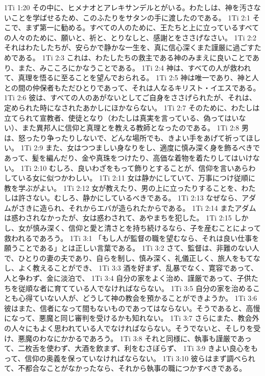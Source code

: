 1Ti 1:20  その中に、ヒメナオとアレキサンデルとがいる。わたしは、神を汚さないことを学ばせるため、このふたりをサタンの手に渡したのである。
1Ti 2:1  そこで、まず第一に勧める。すべての人のために、王たちと上に立っているすべての人々のために、願いと、祈と、とりなしと、感謝とをささげなさい。
1Ti 2:2  それはわたしたちが、安らかで静かな一生を、真に信心深くまた謹厳に過ごすためである。
1Ti 2:3  これは、わたしたちの救主である神のみまえに良いことであり、また、みこころにかなうことである。
1Ti 2:4  神は、すべての人が救われて、真理を悟るに至ることを望んでおられる。
1Ti 2:5  神は唯一であり、神と人との間の仲保者もただひとりであって、それは人なるキリスト・イエスである。
1Ti 2:6  彼は、すべての人のあがないとしてご自身をささげられたが、それは、定められた時になされたあかしにほかならない。
1Ti 2:7  そのために、わたしは立てられて宣教者、使徒となり（わたしは真実を言っている、偽ってはいない）、また異邦人に信仰と真理とを教える教師となったのである。
1Ti 2:8  男は、怒ったり争ったりしないで、どんな場所でも、きよい手をあげて祈ってほしい。
1Ti 2:9  また、女はつつましい身なりをし、適度に慎み深く身を飾るべきであって、髪を編んだり、金や真珠をつけたり、高価な着物を着たりしてはいけない。
1Ti 2:10  むしろ、良いわざをもって飾りとすることが、信仰を言いあらわしている女に似つかわしい。
1Ti 2:11  女は静かにしていて、万事につけ従順に教を学ぶがよい。
1Ti 2:12  女が教えたり、男の上に立ったりすることを、わたしは許さない。むしろ、静かにしているべきである。
1Ti 2:13  なぜなら、アダムがさきに造られ、それからエバが造られたからである。
1Ti 2:14  またアダムは惑わされなかったが、女は惑わされて、あやまちを犯した。
1Ti 2:15  しかし、女が慎み深く、信仰と愛と清さとを持ち続けるなら、子を産むことによって救われるであろう。
1Ti 3:1  「もし人が監督の職を望むなら、それは良い仕事を願うことである」とは正しい言葉である。
1Ti 3:2  さて、監督は、非難のない人で、ひとりの妻の夫であり、自らを制し、慎み深く、礼儀正しく、旅人をもてなし、よく教えることができ、
1Ti 3:3  酒を好まず、乱暴でなく、寛容であって、人と争わず、金に淡泊で、
1Ti 3:4  自分の家をよく治め、謹厳であって、子供たちを従順な者に育てている人でなければならない。
1Ti 3:5  自分の家を治めることも心得ていない人が、どうして神の教会を預かることができようか。
1Ti 3:6  彼はまた、信者になって間もないものであってはならない。そうであると、高慢になって、悪魔と同じ審判を受けるかも知れない。
1Ti 3:7  さらにまた、教会外の人々にもよく思われている人でなければならない。そうでないと、そしりを受け、悪魔のわなにかかるであろう。
1Ti 3:8  それと同様に、執事も謹厳であって、二枚舌を使わず、大酒を飲まず、利をむさぼらず、
1Ti 3:9  きよい良心をもって、信仰の奥義を保っていなければならない。
1Ti 3:10  彼らはまず調べられて、不都合なことがなかったなら、それから執事の職につかすべきである。
